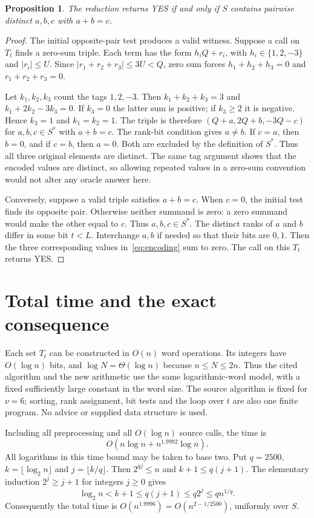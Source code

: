 \documentclass[11pt]{article}
\newtheorem{proposition}[lemma]{Proposition}
\begin{document}
\begin{proposition}\label{prop:correct}
The reduction returns YES if and only if $S$ contains pairwise distinct
$a,b,c$ with $a+b=c$.
\end{proposition}
\begin{proof}
The initial opposite-pair test produces a valid witness.
Suppose a call on $T_t$ finds a zero-sum triple.
Each term has the form $h_iQ+r_i$, with
$h_i\in\{1,2,-3\}$ and $|r_i|\leq U$.
Since $|r_1+r_2+r_3|\leq3U<Q$, zero sum forces
$h_1+h_2+h_3=0$ and $r_1+r_2+r_3=0$.

Let $k_1,k_2,k_3$ count the tags $1,2,-3$.
Then $k_1+k_2+k_3=3$ and $k_1+2k_2-3k_3=0$.
If $k_3=0$ the latter sum is positive; if $k_3\geq2$ it is negative.
Hence $k_3=1$ and $k_1=k_2=1$.
The triple is therefore
$(Q+a,2Q+b,-3Q-c)$ for $a,b,c\in S^*$ with $a+b=c$.
The rank-bit condition gives $a\ne b$.
If $c=a$, then $b=0$, and if $c=b$, then $a=0$.
Both are excluded by the definition of $S^*$.
Thus all three original elements are distinct.
The same tag argument shows that the encoded values are distinct,
so allowing repeated values in a zero-sum convention would not alter
any oracle answer here.

Conversely, suppose a valid triple satisfies $a+b=c$.
When $c=0$, the initial test finds its opposite pair.
Otherwise neither summand is zero: a zero summand would make the other
equal to $c$. Thus $a,b,c\in S^*$.
The distinct ranks of $a$ and $b$ differ in some bit $t<L$.
Interchange $a,b$ if needed so that their bits are $0,1$.
Then the three corresponding values in~\eqref{eq:encoding}
sum to zero. The call on this $T_t$ returns YES.
\end{proof}

\section{Total time and the exact consequence}\label{sec:time}

Each set $T_t$ can be constructed in $O(n)$ word operations.
Its integers have $O(\log n)$ bits, and
$\log N=\Theta(\log n)$ because $n\leq N\leq2n$.
Thus the cited algorithm and the new arithmetic use the same
logarithmic-word model, with a fixed sufficiently large constant
in the word size.
The source algorithm is fixed for $\nu=6$; sorting, rank assignment,
bit tests and the loop over $t$ are also one finite program.
No advice or supplied data structure is used.

Including all preprocessing and all $O(\log n)$ source calls, the time is
\[
 O(n\log n+n^{1.9992}\log n).
\]
All logarithms in this time bound may be taken to base two.
Put $q=2500$, $k=\lfloor\log_2n\rfloor$ and
$j=\lfloor k/q\rfloor$. Then $2^{qj}\leq n$ and
$k+1\leq q(j+1)$. The elementary induction
$2^j\geq j+1$ for integers $j\geq0$ gives
\[
 \log_2n<k+1\leq q(j+1)\leq q2^j\leq qn^{1/q}.
\]
Consequently the total time is
$O(n^{1.9996})=O(n^{2-1/2500})$, uniformly over $S$.
\end{document}
